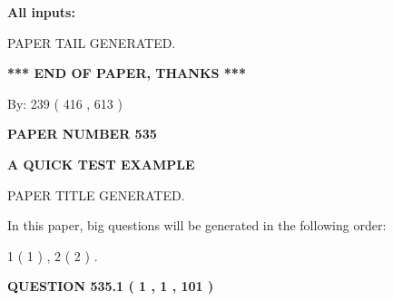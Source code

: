 \documentclass[12pt]{article}
\begin{document}
   
   
   
\noindent{}
   
   
   
   
\noindent\vspace{0.1in}\hspace{-0.08in} {\textbf{\Large{All inputs: }}}
   
   
   
   
   
   
 \vspace{0.2in}
 
   
   
\vspace{2.0in} PAPER TAIL GENERATED.
   
   
   
   
\vspace{1.0in} 
{\textbf{\large{ *** END OF PAPER, THANKS *** }}} 
   
   
\hspace{1.0in} By: 
 239 ( 416 ,  613 )
   
   
   
   
\newpage 
\setcounter{page}{ 
   535001 } 
   
   
   
   
 {\textbf{ \Large{ PAPER NUMBER  535  }}}
   
   
\vspace{0.2in}
   
   
   
   
   
   
   
   
 \vspace{0.2in}
{\LARGE {\textbf{ A QUICK TEST EXAMPLE}}}
   
   
 PAPER TITLE GENERATED.
   
   
   
\vspace{0.2in}
   
In this paper, big questions will be generated in the following order: 
   
   
   1 ( 1 )
 ,
   2 ( 2 )
 .
  
\vspace{0.2in}
  
{\textbf{\Large{QUESTION
535.1 
 ( 1 , 1 , 101 )
}}}
  
  
 
\end{document}
